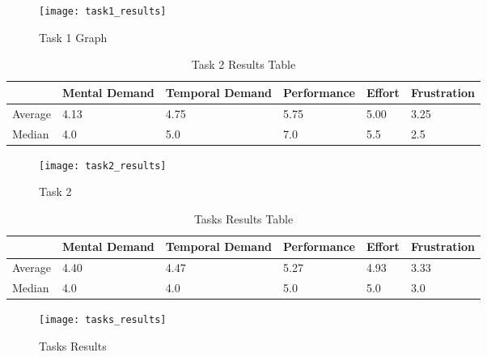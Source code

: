 \begin{figure*}[!htb]
  \caption{Task 1 Graph}
  \label{fig:separated_task_1}
  \centering
  \texttt{[image: task1\_results]}
\end{figure*}

\begin{table}[!htb] \caption{Task 2 Results Table} \label{tab:separated_task_2}
  \begin{center}
    \begin{tabular}[c]{p{4em}|p{4em}|p{4em}|p{4em}|p{4em}|p{4em}}
      \textbf{} &
      \textbf{Mental Demand} &
      \textbf{Temporal Demand} &
      \textbf{Performance} &
      \textbf{Effort} &
      \textbf{Frustration} \\
      \hline Average & 4.13 & 4.75 & 5.75 & 5.00 & 3.25 \\
      \hline Median & 4.0 & 5.0 & 7.0 & 5.5 & 2.5 \\
    \end{tabular}
  \end{center}
\end{table}

\begin{figure*}[!htb]
  \caption{Task 2}
  \label{fig:separated_task_2}
  \centering
  \texttt{[image: task2\_results]}
\end{figure*}

\begin{table}[!htb] \caption{Tasks Results Table} \label{tab:tasks_results}
  \begin{center}
    \begin{tabular}[c]{p{4em}|p{4em}|p{4em}|p{4em}|p{4em}|p{4em}}
      \textbf{} &
      \textbf{Mental Demand} &
      \textbf{Temporal Demand} &
      \textbf{Perfor\-mance} &
      \textbf{Effort} &
      \textbf{Frustration} \\
      \hline Average & 4.40 & 4.47 & 5.27 & 4.93 & 3.33 \\
      \hline Median & 4.0 & 4.0 & 5.0 & 5.0 & 3.0 \\
    \end{tabular}
  \end{center}
\end{table}

\begin{figure*}[!htb]
  \caption{Tasks Results}
  \label{fig:tasks_results}
  \centering
  \texttt{[image: tasks\_results]}
\end{figure*}
